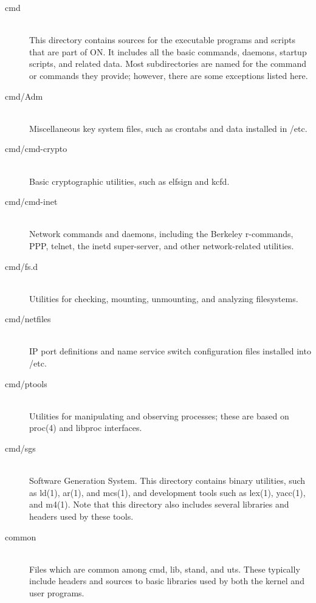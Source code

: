 \documentclass{article}
\begin{document}
\begin{description}
\item[cmd] \hfill \\
  This directory contains sources for the executable programs and
  scripts that are part of ON. It includes all the basic commands, daemons,
  startup scripts, and related data. Most subdirectories are named for the
  command or commands they provide; however, there are some exceptions listed
  here.

\item[cmd/Adm] \hfill \\
  Miscellaneous key system files, such as crontabs and data installed in /etc.

\item[cmd/cmd-crypto] \hfill \\
  Basic cryptographic utilities, such as elfsign and kcfd.

\item[cmd/cmd-inet] \hfill \\
  Network commands and daemons, including the Berkeley r-commands, PPP, telnet,
  the inetd super-server, and other network-related utilities.

\item[cmd/fs.d] \hfill \\
  Utilities for checking, mounting, unmounting, and analyzing filesystems.

\item[cmd/netfiles] \hfill \\
  IP port definitions and name service switch configuration files installed into
  /etc.

\item[cmd/ptools] \hfill \\
  Utilities for manipulating and observing processes; these are based on proc(4)
  and libproc interfaces.

\item[cmd/sgs] \hfill \\
  Software Generation System. This directory contains binary utilities, such as
  ld(1), ar(1), and mcs(1), and development tools such as lex(1), yacc(1), and
  m4(1). Note that this directory also includes several libraries and headers
  used by these tools.

\item[common] \hfill \\
  Files which are common among cmd, lib, stand, and uts. These typically include
  headers and sources to basic libraries used by both the kernel and user
  programs.


\end{description}
\end{document}
